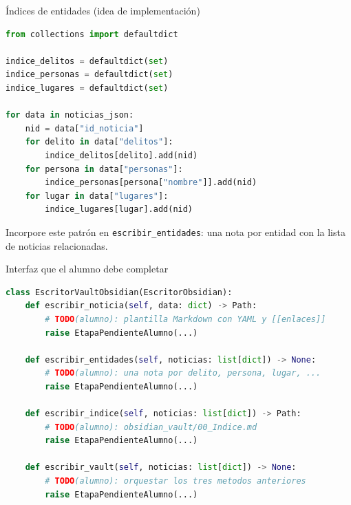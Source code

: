 \documentclass[11pt,aspectratio=169]{beamer}
\newcommand{\code}[1]{\texttt{#1}}
\begin{document}
\begin{frame}[fragile]{Índices de entidades (idea de implementación)}
\tiny
\begin{lstlisting}[language=Python]
from collections import defaultdict

indice_delitos = defaultdict(set)
indice_personas = defaultdict(set)
indice_lugares = defaultdict(set)

for data in noticias_json:
    nid = data["id_noticia"]
    for delito in data["delitos"]:
        indice_delitos[delito].add(nid)
    for persona in data["personas"]:
        indice_personas[persona["nombre"]].add(nid)
    for lugar in data["lugares"]:
        indice_lugares[lugar].add(nid)
\end{lstlisting}

\scriptsize
Incorpore este patrón en \code{escribir\_entidades}: una nota por entidad con la lista de noticias relacionadas.
\end{frame}

\begin{frame}[fragile]{Interfaz que el alumno debe completar}
\tiny
\begin{lstlisting}[language=Python]
class EscritorVaultObsidian(EscritorObsidian):
    def escribir_noticia(self, data: dict) -> Path:
        # TODO(alumno): plantilla Markdown con YAML y [[enlaces]]
        raise EtapaPendienteAlumno(...)

    def escribir_entidades(self, noticias: list[dict]) -> None:
        # TODO(alumno): una nota por delito, persona, lugar, ...
        raise EtapaPendienteAlumno(...)

    def escribir_indice(self, noticias: list[dict]) -> Path:
        # TODO(alumno): obsidian_vault/00_Indice.md
        raise EtapaPendienteAlumno(...)

    def escribir_vault(self, noticias: list[dict]) -> None:
        # TODO(alumno): orquestar los tres metodos anteriores
        raise EtapaPendienteAlumno(...)
\end{lstlisting}
\end{frame}
\end{document}
